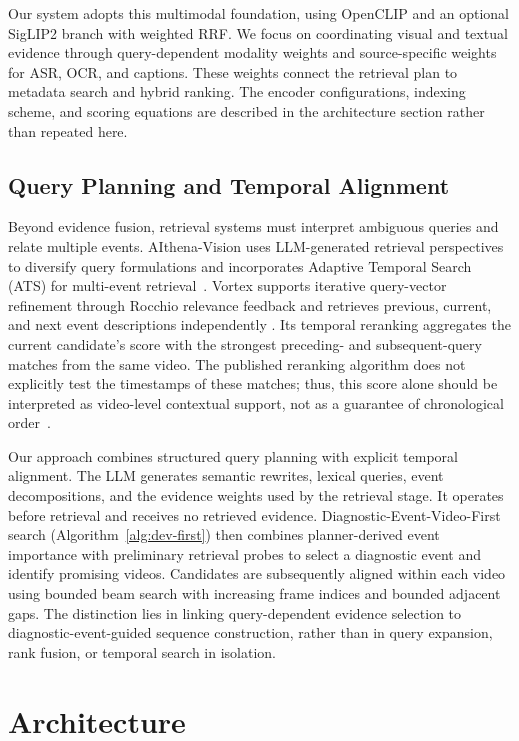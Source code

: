 \documentclass[11pt]{article}
\begin{document}
Our system adopts this multimodal foundation, using OpenCLIP and an
optional SigLIP2 branch with weighted RRF. We focus on coordinating
visual and textual evidence through query-dependent modality weights
and source-specific weights for ASR, OCR, and captions. These weights
connect the retrieval plan to metadata search and hybrid ranking.
The encoder configurations, indexing scheme, and scoring equations are
described in the architecture section rather than repeated here.

\subsection{Query Planning and Temporal Alignment}
\label{sec:related-work-temporal}

Beyond evidence fusion, retrieval systems must interpret ambiguous
queries and relate multiple events. AIthena-Vision uses LLM-generated
retrieval perspectives to diversify query formulations and incorporates
Adaptive Temporal Search (ATS) for multi-event
retrieval~\citep{nguyen2027aithena}. Vortex supports iterative query-vector
refinement through Rocchio relevance feedback and retrieves previous,
current, and next event descriptions independently
\citep{nguyen2027vortex}. Its temporal reranking aggregates the current
candidate's score with the strongest preceding- and subsequent-query
matches from the same video. The published reranking algorithm does
not explicitly test the timestamps of these matches; thus, this score
alone should be interpreted as video-level contextual support, not as
a guarantee of chronological order~\citep{nguyen2027vortex}.

Our approach combines structured query planning with explicit temporal
alignment. The LLM generates semantic rewrites, lexical queries, event
decompositions, and the evidence weights used by the retrieval stage.
It operates before retrieval and receives no retrieved evidence.
Diagnostic-Event-Video-First search (Algorithm~\ref{alg:dev-first}) then
combines planner-derived event importance with preliminary retrieval
probes to select a diagnostic event and identify promising videos.
Candidates are subsequently aligned within each video using bounded
beam search with increasing frame indices and bounded adjacent gaps.
The distinction lies in linking query-dependent evidence selection to
diagnostic-event-guided sequence construction, rather than in query
expansion, rank fusion, or temporal search in isolation.


\section{Architecture}
\end{document}
